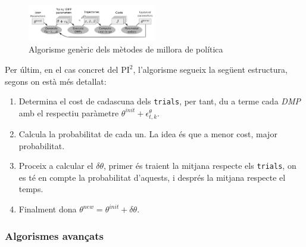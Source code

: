 \documentclass[12pt,a4paper,final,twoside]{article}
\begin{document}
\begin{figure}[tb]
\centering
\includegraphics[width=0.5\textwidth]{Imatges/policy-improvement-loop}
\caption{Algorisme genèric dels mètodes de millora de política \cite{Stulp2011}}
\label{fig:policy-improvement-loop}
\end{figure}

Per últim, en el cas concret del $\mathrm{PI^2}$, l'algorisme segueix la següent estructura, segons \cite{Stulp2011} on està més detallat:

\begin{enumerate}
\item Determina el cost de cadascuna dels \texttt{trials}, per tant, du a terme cada \textit{DMP} amb el respectiu paràmetre $\theta^{init} + \epsilon_{t,k}^{\theta}$.

\item Calcula la probabilitat de cada un. La idea és que a menor cost, major probabilitat.

\item Proceix a calcular el $\delta\theta$, primer és traient la mitjana respecte els \texttt{trials}, on es té en compte la probabilitat d'aquests, i després la mitjana respecte el temps.

\item Finalment dona $\theta^{new} = \theta^{init} + \delta\theta$.
\end{enumerate}

\subsubsection{Algorismes avançats}
\end{document}
